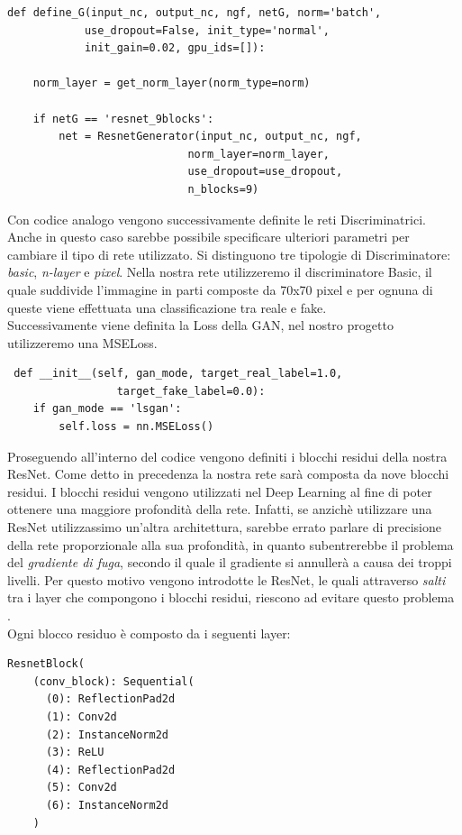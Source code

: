 \begin{verbatim}
def define_G(input_nc, output_nc, ngf, netG, norm='batch',
            use_dropout=False, init_type='normal',             
            init_gain=0.02, gpu_ids=[]):
                
    norm_layer = get_norm_layer(norm_type=norm)

    if netG == 'resnet_9blocks':
        net = ResnetGenerator(input_nc, output_nc, ngf,
                            norm_layer=norm_layer,
                            use_dropout=use_dropout,
                            n_blocks=9)
\end{verbatim}
Con codice analogo vengono successivamente definite le reti Discriminatrici. Anche in questo caso sarebbe possibile specificare ulteriori parametri per cambiare il tipo di rete utilizzato. Si distinguono tre tipologie di Discriminatore: \emph{basic}, \emph{n-layer} e \emph{pixel}. Nella nostra rete utilizzeremo il discriminatore Basic, il quale suddivide l'immagine in parti composte da 70x70 pixel e per ognuna di queste viene effettuata una classificazione tra reale e fake.
\\Successivamente viene definita la Loss della GAN, nel nostro progetto utilizzeremo una MSELoss.
\begin{verbatim}
 def __init__(self, gan_mode, target_real_label=1.0,
                 target_fake_label=0.0):
    if gan_mode == 'lsgan':
        self.loss = nn.MSELoss()
\end{verbatim}
Proseguendo all'interno del codice vengono definiti i blocchi residui della nostra ResNet. Come detto in precedenza la nostra rete sarà composta da nove blocchi residui. I blocchi residui vengono utilizzati nel Deep Learning al fine di poter ottenere una maggiore profondità della rete. Infatti, se anzichè utilizzare una ResNet utilizzassimo un'altra architettura, sarebbe errato parlare di precisione della rete proporzionale alla sua profondità, in quanto subentrerebbe il problema del \emph{gradiente di fuga}, secondo il quale il gradiente si annullerà a causa dei troppi livelli. Per questo motivo vengono introdotte le ResNet, le quali attraverso \emph{salti} tra i layer che compongono i blocchi residui, riescono ad evitare questo problema \cite{targ2016resnet}.
\\Ogni blocco residuo è composto da i seguenti layer:
\begin{verbatim}
ResnetBlock(
    (conv_block): Sequential(
      (0): ReflectionPad2d
      (1): Conv2d
      (2): InstanceNorm2d
      (3): ReLU
      (4): ReflectionPad2d
      (5): Conv2d
      (6): InstanceNorm2d
    )
\end{verbatim}
